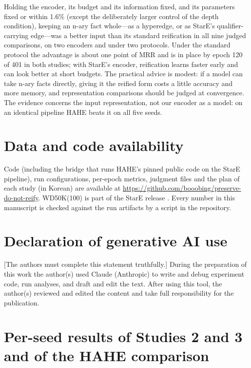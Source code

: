 \documentclass[11pt,a4paper]{article}
\begin{document}
Holding the encoder, its budget and its information fixed, and its parameters fixed or within 1.6\% (except the deliberately larger control of the depth condition), keeping an n-ary fact whole---as a hyperedge, or as StarE's qualifier-carrying edge---was a better input than its standard reification in all nine judged comparisons, on two encoders and under two protocols. Under the standard protocol the advantage is about one point of MRR and is in place by epoch 120 of 401 in both studies; with StarE's encoder, reification learns faster early and can look better at short budgets. The practical advice is modest: if a model can take n-ary facts directly, giving it the reified form costs a little accuracy and more memory, and representation comparisons should be judged at convergence. The evidence concerns the input representation, not our encoder as a model: on an identical pipeline HAHE beats it on all five seeds.

\section*{Data and code availability}
Code (including the bridge that runs HAHE's pinned public code on the StarE pipeline), run configurations, per-epoch metrics, judgment files and the plan of each study (in Korean) are available at \url{https://github.com/booobing/preserve-do-not-reify}. WD50K(100) is part of the StarE release \citep{galkin2020stare}. Every number in this manuscript is checked against the run artifacts by a script in the repository.

\section*{Declaration of generative AI use}
[The authors must complete this statement truthfully.] During the preparation of this work the author(s) used Claude (Anthropic) to write and debug experiment code, run analyses, and draft and edit the text. After using this tool, the author(s) reviewed and edited the content and take full responsibility for the publication.




\appendix
\section{Per-seed results of Studies 2 and 3 and of the HAHE comparison}
\label{app:seeds}
\end{document}
